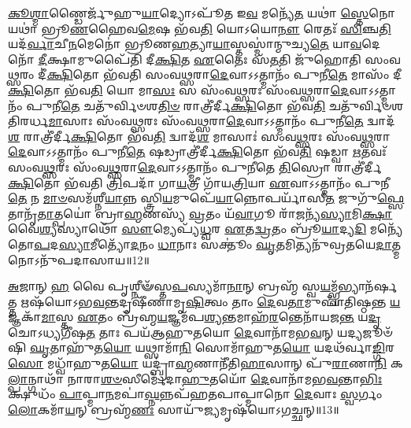 \-\ul{𑌕𑍂}\-\-\ul{𑌶𑍍𑌮𑌾}\-𑌣𑍍𑌡𑍈𑌰𑍍𑌜𑍁᳴𑌹𑍁\-\ul{𑌯𑌾}\-𑌦𑍍𑌯𑍋𑌽𑌪𑍂᳴𑌤 𑌇\-\ul{𑌵} 𑌮𑌨𑍍𑌯𑍇᳴\-\ul{𑌤} 𑌯𑌥𑌾॑ \ul{𑌸𑍍𑌤𑍇}\-𑌨𑍋 𑌯𑌥𑌾॑ 𑌭𑍍𑌰𑍂\-\ul{𑌣}\-𑌹𑍈𑌵\-\ul{𑌮𑍇}\-𑌷 𑌭᳴𑌵\-\ul{𑌤𑌿} 𑌯𑍋𑌽𑌯𑍋\-\ul{𑌨𑍗} 𑌰𑍇𑌤𑌃᳴ \ul{𑌸𑌿}\-𑌞𑍍𑌚\-\ul{𑌤𑌿} 𑌯𑌦᳴\-\ul{𑌰𑍍𑌵𑌾}\-𑌚𑍀\-\ul{𑌨}\-𑌮𑍇𑌨𑍋॑ 𑌭𑍍𑌰𑍂𑌣\-\ul{𑌹}\-𑌤𑍍𑌯𑌾\-\ul{𑌯𑌾}\-𑌸𑍍𑌤𑌸𑍍𑌮𑌾॑𑌨𑍍𑌮𑍁𑌚𑍍𑌯\-\ul{𑌤𑍇} 𑌯𑌾\-\ul{𑌵}\-𑌦𑍇𑌨𑍋᳴ \ul{𑌦𑍀}\-𑌕𑍍𑌷𑌾𑌮𑍁𑌪𑍈᳴𑌤𑌿 𑌦𑍀\-\ul{𑌕𑍍𑌷𑌿}\-𑌤 \ul{𑌏}\-𑌤𑍈𑌃 𑌸᳴\-\ul{𑌤}\-𑌤𑌿 𑌜𑍁᳴𑌹𑍋𑌤𑌿 𑌸𑌂𑌵\-\ul{𑌥𑍍𑌸}\-𑌰𑌂 𑌦𑍀॑\-\ul{𑌕𑍍𑌷𑌿}\-𑌤𑍋 𑌭᳴𑌵𑌤𑌿 𑌸𑌂𑌵\-\ul{𑌥𑍍𑌸}\-𑌰𑌾\-\ul{𑌦𑍇}\-𑌵𑌾𑌽𑌽𑌤𑍍𑌮𑌾𑌨𑌂᳴ 𑌪𑍁𑌨𑍀\-\ul{𑌤𑍇} 𑌮𑌾𑌸𑌂᳴ 𑌦𑍀\-\ul{𑌕𑍍𑌷𑌿}\-𑌤𑍋 𑌭᳴𑌵\-\ul{𑌤𑌿} 𑌯𑍋 𑌮𑌾\-\ul{𑌸𑌃} 𑌸 𑌸𑌂᳴𑌵\-\ul{𑌥𑍍𑌸}\-𑌰𑌃 𑌸𑌂᳴𑌵\-\ul{𑌥𑍍𑌸}\-𑌰𑌾\-\ul{𑌦𑍇}\-𑌵𑌾𑌽𑌽𑌤𑍍𑌮𑌾𑌨𑌂᳴ 𑌪𑍁𑌨𑍀\-\ul{𑌤𑍇} 𑌚𑌤𑍁᳴𑌰𑍍𑌵𑌿𑍞𑌶\-\ul{𑌤𑌿}\-\-\ul{𑍞} 𑌰𑌾𑌤𑍍𑌰𑍀॑𑌰𑍍𑌦𑍀\-\ul{𑌕𑍍𑌷𑌿}\-𑌤𑍋 𑌭᳴𑌵\-\ul{𑌤𑌿} 𑌚𑌤𑍁᳴𑌰𑍍𑌵𑌿𑍞𑌶𑌤𑌿𑌰𑌰𑍍𑌧\-\ul{𑌮𑌾}\-𑌸𑌾𑌃 𑌸𑌂᳴𑌵\-\ul{𑌥𑍍𑌸}\-𑌰𑌃 𑌸𑌂᳴𑌵\-\ul{𑌥𑍍𑌸}\-𑌰𑌾\-\ul{𑌦𑍇}\-𑌵𑌾𑌽𑌽𑌤𑍍𑌮𑌾𑌨𑌂᳴ 𑌪𑍁𑌨𑍀\-\ul{𑌤𑍇} 𑌦𑍍𑌵𑌾𑌦᳴\-\ul{𑌶} 𑌰𑌾𑌤𑍍𑌰𑍀॑𑌰𑍍𑌦𑍀\-\ul{𑌕𑍍𑌷𑌿}\-𑌤𑍋 𑌭᳴𑌵\-\ul{𑌤𑌿} 𑌦𑍍𑌵𑌾𑌦᳴\-\ul{𑌶} 𑌮𑌾𑌸𑌾𑌃॑ 𑌸𑌂𑌵\-\ul{𑌥𑍍𑌸}\-𑌰𑌃 𑌸𑌂᳴𑌵\-\ul{𑌥𑍍𑌸}\-𑌰𑌾\-\ul{𑌦𑍇}\-𑌵𑌾𑌽𑌽𑌤𑍍𑌮𑌾𑌨𑌂᳴ 𑌪𑍁𑌨𑍀\-\ul{𑌤𑍇} 𑌷𑌡𑍍𑌰𑌾𑌤𑍍𑌰𑍀॑𑌰𑍍𑌦𑍀\-\ul{𑌕𑍍𑌷𑌿}\-𑌤𑍋 𑌭᳴𑌵\-\ul{𑌤𑌿} 𑌷𑌡𑍍𑌵𑌾 \ul{𑌋}\-𑌤𑌵𑌃᳴ 𑌸𑌂𑌵\-\ul{𑌥𑍍𑌸}\-𑌰𑌃 𑌸𑌂᳴𑌵\-\ul{𑌥𑍍𑌸}\-𑌰𑌾\-\ul{𑌦𑍇}\-𑌵𑌾𑌽𑌽𑌤𑍍𑌮𑌾𑌨𑌂᳴ 𑌪𑍁𑌨𑍀𑌤𑍇 \ul{𑌤𑌿}\-𑌸𑍍𑌰𑍋 𑌰𑌾𑌤𑍍𑌰𑍀॑𑌰𑍍𑌦𑍀\-\ul{𑌕𑍍𑌷𑌿}\-𑌤𑍋 𑌭᳴𑌵𑌤𑌿 \ul{𑌤𑍍𑌰𑌿}\-𑌪𑌦𑌾᳴ 𑌗𑌾\-\ul{𑌯}\-𑌤𑍍𑌰𑍀 𑌗𑌾᳴𑌯\-\ul{𑌤𑍍𑌰𑌿}\-𑌯𑌾 \ul{𑌏}\-𑌵𑌾𑌽𑌽𑌤𑍍𑌮𑌾𑌨𑌂᳴ 𑌪𑍁𑌨𑍀\-\ul{𑌤𑍇} 𑌨 \ul{𑌮𑌾}\-\-\ul{𑍞}\-𑌸𑌮᳴𑌶𑍍𑌨𑍀\-\ul{𑌯𑌾}\-𑌨𑍍𑌨 𑌸𑍍𑌤𑍍𑌰𑌿\-\ul{𑌯}\-𑌮𑍁𑌪𑍇᳴\-\ul{𑌯𑌾}\-𑌨𑍍𑌨𑍋𑌪𑌰𑍍𑌯𑌾᳴𑌸𑍀\-\ul{𑌤} 𑌜𑍁𑌗𑍁᳴\-\ul{𑌫𑍍𑌸𑍇}\-𑌤𑌾𑌨𑍃᳴\-\ul{𑌤𑌾}\-𑌤𑍍𑌪𑌯𑍋॑ 𑌬𑍍𑌰𑌾\-\ul{𑌹𑍍𑌮}\-𑌣𑌸𑍍𑌯᳴ \ul{𑌵𑍍𑌰}\-𑌤𑌂 𑌯᳴\-\ul{𑌵𑌾}\-𑌗𑍂 𑌰𑌾᳴\-\ul{𑌜}\-𑌨𑍍𑌯᳴\-\ul{𑌸𑍍𑌯𑌾}\-𑌮𑌿\-\ul{𑌕𑍍𑌷𑌾} 𑌵𑍈\-\ul{𑌶𑍍𑌯}\-𑌸𑍍𑌯𑌾𑌥𑍋᳴ \ul{𑌸𑍗}\-𑌮𑍍𑌯𑍇𑌪𑍍𑌯᳴\-\ul{𑌧𑍍𑌵}\-𑌰 \ul{𑌏}\-𑌤\-\ul{𑌦𑍍𑌵𑍍𑌰}\-𑌤𑌂 𑌬𑍍𑌰𑍂᳴\-\ul{𑌯𑌾}\-𑌦𑍍𑌯\-\ul{𑌦𑌿} 𑌮𑌨𑍍𑌯𑍇᳴𑌤𑍋\-\ul{𑌪}\-𑌦\-\ul{𑌸𑍍𑌯𑌾}\-𑌮𑍀𑌤𑍍𑌯𑍋᳴\-\ul{𑌦}\-𑌨𑌂 \ul{𑌧𑌾}\-𑌨𑌾𑌃 𑌸𑌕𑍍𑌤𑍂𑌂॑ \ul{𑌘𑍃}\-𑌤𑌮𑌿𑌤𑍍𑌯𑌨𑍁᳴𑌵𑍍𑌰𑌤𑌯𑍇\-\ul{𑌦𑌾}\-𑌤𑍍𑌮𑌨𑍋𑌽𑌨𑍁᳴𑌪𑌦𑌾𑌸𑌾𑌯॥12॥ 
\anuvakamend

\-\ul{𑌅}\-𑌜𑌾𑌨𑍍 \ul{𑌹} 𑌵𑍈 𑌪𑍃𑌶𑍍𑌨𑍀𑍟᳴𑌸𑍍𑌤\-\ul{𑌪}\-𑌸𑍍𑌯𑌮𑌾᳴\-\ul{𑌨𑌾}\-𑌨𑍍 𑌬𑍍𑌰𑌹𑍍𑌮᳴ 𑌸𑍍𑌵\-\ul{𑌯}\-𑌮𑍍𑌭𑍍𑌵᳴𑌭𑍍𑌯𑌾𑌨᳴𑌰𑍍\mbox{}\-\ul{𑌷}\-𑌤𑍍𑌤 𑌋𑌷᳴𑌯𑍋𑌽𑌭\-\ul{𑌵}\-𑌨𑍍𑌤𑌦𑍃𑌷𑍀᳴𑌣𑌾𑌮𑍃\-\ul{𑌷𑌿}\-𑌤𑍍𑌵𑌂 𑌤𑌾𑌂 \ul{𑌦𑍇}\-𑌵\-\ul{𑌤𑌾}\-𑌮𑍁𑌪𑌾᳴𑌤𑌿𑌷𑍍𑌠𑌨𑍍𑌤 \ul{𑌯}\-𑌜𑍍𑌞𑌕𑌾᳴\-\ul{𑌮𑌾}\-𑌸𑍍𑌤 \ul{𑌏}\-𑌤𑌂 𑌬𑍍𑌰᳴𑌹𑍍𑌮\-\ul{𑌯}\-𑌜𑍍𑌞𑌮᳴𑌪\-\ul{𑌶𑍍𑌯}\-𑌨𑍍𑌤𑌮𑌾𑌹᳴\-\ul{𑌰}\-𑌨𑍍𑌤𑍇𑌨𑌾᳴𑌯𑌜\-\ul{𑌨𑍍𑌤} 𑌯\-\ul{𑌦𑍃}\-𑌚𑍋𑌽𑌧𑍍𑌯𑌗𑍀᳴𑌷\-\ul{𑌤} 𑌤𑌾𑌃 𑌪𑌯᳴𑌆𑌹𑍁𑌤𑌯𑍋 \ul{𑌦𑍇}\-𑌵𑌾𑌨𑌾᳴𑌮𑌭\-\ul{𑌵}\-𑌨𑍍 𑌯𑌦𑍍𑌯𑌜𑍂𑍞᳴𑌷𑌿 \ul{𑌘𑍃}\-𑌤𑌾𑌹𑍁᳴𑌤\-\ul{𑌯𑍋} 𑌯𑌥𑍍𑌸𑌾𑌮𑌾᳴\-\ul{𑌨𑌿} 𑌸𑍋𑌮𑌾᳴𑌹𑍁𑌤\-\ul{𑌯𑍋} 𑌯𑌦𑌥᳴𑌰𑍍𑌵𑌾\-\ul{𑌙𑍍𑌗𑌿}\-𑌰\-\ul{𑌸𑍋} 𑌮𑌧𑍍𑌵𑌾᳴𑌹𑍁𑌤\-\ul{𑌯𑍋} 𑌯𑌦𑍍𑌬𑍍𑌰𑌾॑\-\ul{𑌹𑍍𑌮}\-𑌣𑌾𑌨𑍀᳴𑌤𑌿\-\ul{𑌹𑌾}\-𑌸𑌾𑌨𑍍 𑌪𑍁᳴\-\ul{𑌰𑌾}\-𑌣𑌾\-\ul{𑌨𑌿} 𑌕\-\ul{𑌲𑍍𑌪𑌾}\-𑌨𑍍𑌗𑌾𑌥𑌾᳴ 𑌨𑌾𑌰𑌾\-\ul{𑌶}\-\-\ul{𑍞}\-𑌸𑍀𑌰𑍍𑌮𑍇᳴𑌦𑌾\-\ul{𑌹𑍁}\-𑌤𑌯𑍋᳴ \ul{𑌦𑍇}\-𑌵𑌾𑌨𑌾᳴𑌮𑌭\-\ul{𑌵}\-𑌨𑍍𑌤𑌾\-\ul{𑌭𑌿𑌃} 𑌕𑍍𑌷𑍁𑌧𑌂᳴ \ul{𑌪𑌾}\-𑌪𑍍𑌮𑌾\-\ul{𑌨}\-𑌮\-𑌪𑌾॑\-\ul{𑌘𑍍𑌨}\-𑌨𑍍𑌨𑌪᳴𑌹𑌤𑌪𑌾𑌪𑍍𑌮𑌾𑌨𑍋 \ul{𑌦𑍇}\-𑌵𑌾𑌃 \ul{𑌸𑍍𑌵}\-𑌰𑍍𑌗𑌂 \ul{𑌲𑍋}\-𑌕𑌮𑌾᳴\-\ul{𑌯}\-𑌨𑍍 𑌬𑍍𑌰𑌹𑍍𑌮᳴\-\ul{𑌣𑌃} 𑌸𑌾𑌯𑍁᳴\-\ul{𑌜𑍍𑌯}\-𑌮𑍃𑌷᳴𑌯𑍋𑌽𑌗𑌚𑍍𑌛𑌨𑍍॥13॥\anuvakamend

